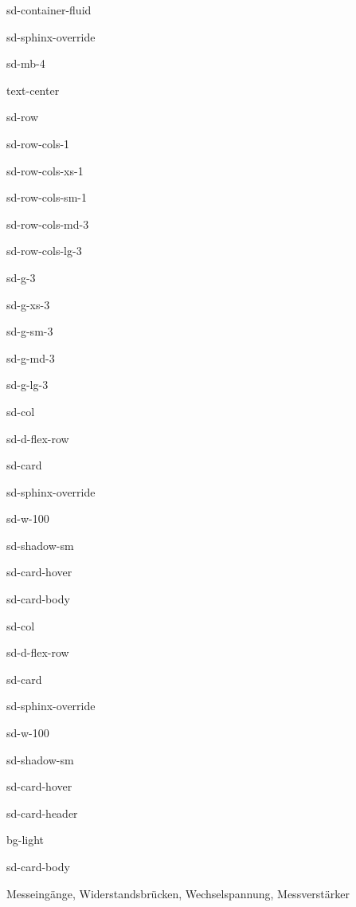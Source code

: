\documentclass[letterpaper,10pt,english]{jupyterBook}
\let\sphinxpxdimen\pdfpxdimen\else\newdimen\sphinxpxdimen
\begin{document}
\begin{sphinxuseclass}{sd-container-fluid}
\begin{sphinxuseclass}{sd-sphinx-override}
\begin{sphinxuseclass}{sd-mb-4}
\begin{sphinxuseclass}{text-center}
\begin{sphinxuseclass}{sd-row}
\begin{sphinxuseclass}{sd-row-cols-1}
\begin{sphinxuseclass}{sd-row-cols-xs-1}
\begin{sphinxuseclass}{sd-row-cols-sm-1}
\begin{sphinxuseclass}{sd-row-cols-md-3}
\begin{sphinxuseclass}{sd-row-cols-lg-3}
\begin{sphinxuseclass}{sd-g-3}
\begin{sphinxuseclass}{sd-g-xs-3}
\begin{sphinxuseclass}{sd-g-sm-3}
\begin{sphinxuseclass}{sd-g-md-3}
\begin{sphinxuseclass}{sd-g-lg-3}
\begin{sphinxuseclass}{sd-col}
\begin{sphinxuseclass}{sd-d-flex-row}
\begin{sphinxuseclass}{sd-card}
\begin{sphinxuseclass}{sd-sphinx-override}
\begin{sphinxuseclass}{sd-w-100}
\begin{sphinxuseclass}{sd-shadow-sm}
\begin{sphinxuseclass}{sd-card-hover}
\begin{sphinxuseclass}{sd-card-body}
\end{sphinxuseclass}{\hyperref[\detokenize{content/5_Dynamische_Messsysteme::doc}]{}}
\end{sphinxuseclass}
\end{sphinxuseclass}
\end{sphinxuseclass}
\end{sphinxuseclass}
\end{sphinxuseclass}
\end{sphinxuseclass}
\end{sphinxuseclass}
\begin{sphinxuseclass}{sd-col}
\begin{sphinxuseclass}{sd-d-flex-row}
\begin{sphinxuseclass}{sd-card}
\begin{sphinxuseclass}{sd-sphinx-override}
\begin{sphinxuseclass}{sd-w-100}
\begin{sphinxuseclass}{sd-shadow-sm}
\begin{sphinxuseclass}{sd-card-hover}
\begin{sphinxuseclass}{sd-card-header}
\begin{sphinxuseclass}{bg-light}
\sphinxAtStartPar
{}

\end{sphinxuseclass}
\end{sphinxuseclass}
\begin{sphinxuseclass}{sd-card-body}
\noindent\sphinxincludegraphics[height=120\sphinxpxdimen]{{messbruecke}.png}

\sphinxAtStartPar
Messeingänge, Widerstandsbrücken, Wechselspannung, Messverstärker


\end{sphinxuseclass}
\end{sphinxuseclass}
\end{sphinxuseclass}
\end{sphinxuseclass}
\end{sphinxuseclass}
\end{sphinxuseclass}
\end{sphinxuseclass}
\end{sphinxuseclass}
\end{sphinxuseclass}
\end{sphinxuseclass}
\end{sphinxuseclass}
\end{sphinxuseclass}
\end{sphinxuseclass}
\end{sphinxuseclass}
\end{sphinxuseclass}
\end{sphinxuseclass}
\end{sphinxuseclass}
\end{sphinxuseclass}
\end{sphinxuseclass}
\end{sphinxuseclass}
\end{sphinxuseclass}
\end{sphinxuseclass}
\end{sphinxuseclass}
\end{document}
